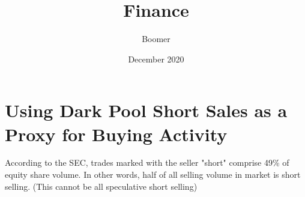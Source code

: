 \documentclass[12pt, oneside]{article}
\title{Finance}
\author{Boomer}
\date{December 2020}
\begin{document}
\maketitle

\newpage

\tableofcontents

\newpage

\section{Using Dark Pool Short Sales as a Proxy for Buying Activity}

  According to the SEC, trades marked with the seller "short" comprise 49\% of equity share volume. In other words, half of all selling volume in market is short selling. (This cannot be all speculative short selling)
\end{document}
